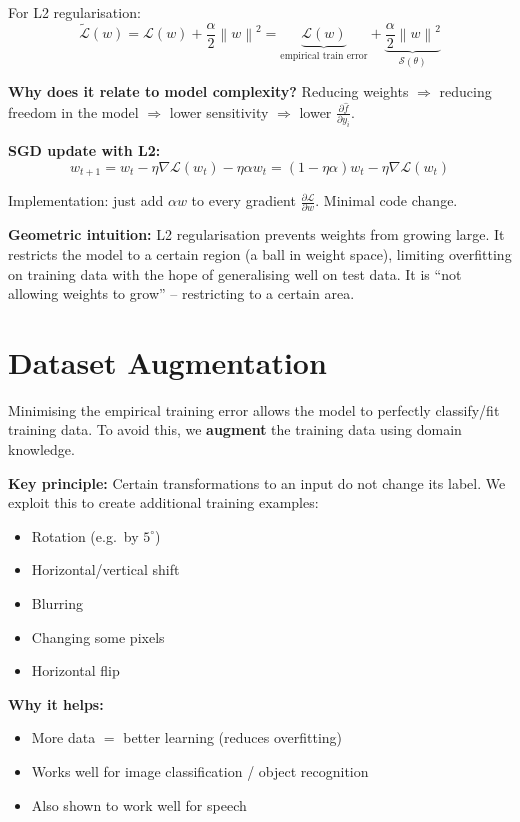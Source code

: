 \documentclass[12pt,a4paper]{article}
\newcommand{\norm}[1]{\left\|#1\right\|}
\newcommand{\Loss}{\mathcal{L}}
\newcommand{\Reg}{\mathcal{S}}
\begin{document}
For L2 regularisation:
\[
\tilde{\Loss}(w)
= \Loss(w) + \frac{\alpha}{2}\norm{w}^2
= \underbrace{\Loss(w)}_{\text{empirical train error}}
+ \underbrace{\frac{\alpha}{2}\norm{w}^2}_{\Reg(\theta)}
\]

\textbf{Why does it relate to model complexity?} Reducing weights $\Rightarrow$ reducing freedom in the model $\Rightarrow$ lower sensitivity $\Rightarrow$ lower $\frac{\partial\hat{f}}{\partial y_i}$.

\textbf{SGD update with L2:}
\[
w_{t+1} = w_t - \eta\nabla\Loss(w_t) - \eta\alpha w_t = (1-\eta\alpha)w_t - \eta\nabla\Loss(w_t)
\]

Implementation: just add $\alpha w$ to every gradient $\frac{\partial\Loss}{\partial w}$. Minimal code change.

\textbf{Geometric intuition:} L2 regularisation prevents weights from growing large. It restricts the model to a certain region (a ball in weight space), limiting overfitting on training data with the hope of generalising well on test data. It is ``not allowing weights to grow'' -- restricting to a certain area.

\section{Dataset Augmentation}

Minimising the empirical training error allows the model to perfectly classify/fit training data. To avoid this, we \textbf{augment} the training data using domain knowledge.

\textbf{Key principle:} Certain transformations to an input do not change its label. We exploit this to create additional training examples:
\begin{itemize}
  \item Rotation (e.g.\ by $5^\circ$)
  \item Horizontal/vertical shift
  \item Blurring
  \item Changing some pixels
  \item Horizontal flip
\end{itemize}

\textbf{Why it helps:}
\begin{itemize}
  \item More data $=$ better learning (reduces overfitting)
  \item Works well for image classification / object recognition
  \item Also shown to work well for speech
\end{itemize}
\end{document}
